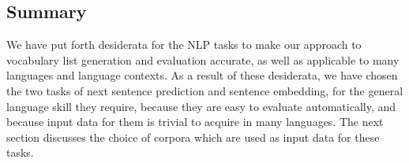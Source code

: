 \subsection{Summary}
We have put forth desiderata for the NLP tasks to make our approach to vocabulary list generation and evaluation accurate, as well as applicable to many languages and language contexts.
As a result of these desiderata, we have chosen the two tasks of next sentence prediction and sentence embedding, for the general language skill they require, because they are easy to evaluate automatically, and because input data for them is trivial to acquire in many languages.
The next section discusses the choice of corpora which are used as input data for these tasks.


%
%
%
%
%



